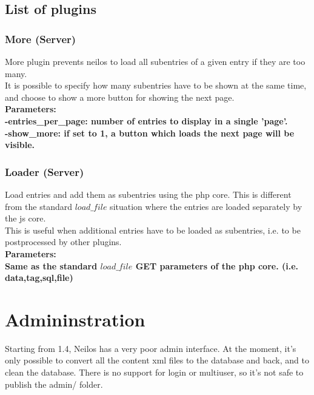 \documentclass[a4paper,12pt]{article}
\begin{document}
\subsection{List of plugins}
\subsubsection{More (Server)}
More plugin prevents neilos to load all subentries of a given entry if they are too many.\\
It is possible to specify how many subentries have to be shown at the same time, and choose to show a more button for showing the next page.\\
\bfseries Parameters:\\
\normalfont \normalsize -entries\_per\_page: number of entries to display in a single 'page'.\\
-show\_more: if set to 1, a button which loads the next page will be visible.\\
\subsubsection{Loader (Server)}
Load entries and add them as subentries using the php core. This is different from the standard $load\_file$ situation where the entries are loaded separately by the js core.\\
This is useful when additional entries have to be loaded as subentries, i.e. to be postprocessed by other plugins.\\
\bfseries Parameters:\\
\normalfont \normalsize Same as the standard $load\_file$ GET parameters of the php core. (i.e. data,tag,sql,file)
\section{Admininstration}
Starting from 1.4, Neilos has a very poor admin interface. At the moment, it's only possible to convert all the content xml files to the database and back, and to clean the database. There is no support for login or multiuser, so it's not safe to publish the admin/ folder.
\end{document}
